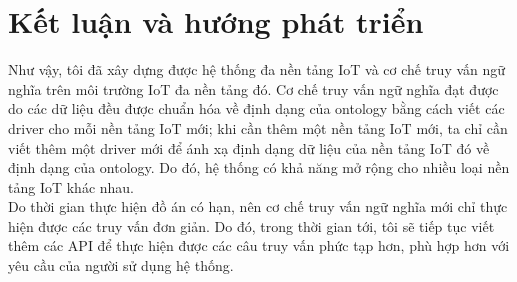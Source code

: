 \section{Kết luận và hướng phát triển}
Như vậy, tôi đã xây dựng được hệ thống đa nền tảng IoT và cơ chế truy vấn ngữ nghĩa trên môi trường IoT đa nền tảng đó. Cơ chế truy vấn ngữ nghĩa đạt được do các dữ liệu đều được chuẩn hóa về định dạng của ontology bằng cách viết các driver cho mỗi nền tảng IoT mới; khi cần thêm một nền tảng IoT mới, ta chỉ cần viết thêm một driver mới để ánh xạ định dạng dữ liệu của nền tảng IoT đó về định dạng của ontology. Do đó, hệ thống có khả năng mở rộng cho nhiều loại nền tảng IoT khác nhau.\\
Do thời gian thực hiện đồ án có hạn, nên cơ chế truy vấn ngữ nghĩa mới chỉ thực hiện được các truy vấn đơn giản. Do đó, trong thời gian tới, tôi sẽ tiếp tục viết thêm các API để thực hiện được các câu truy vấn phức tạp hơn, phù hợp hơn với yêu cầu của người sử dụng hệ thống.\\





